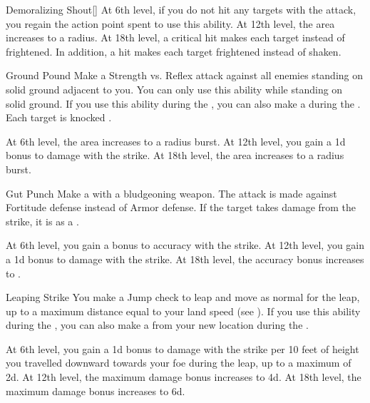 {\begin{ability}{Demoralizing Shout}[]
                At 6th level, if you do not hit any targets with the attack, you regain the action point spent to use this ability.
                At 12th level, the area increases to a \areahuge radius.
                At 18th level, a critical hit makes each target \panicked instead of frightened.
                In addition, a hit makes each target frightened instead of shaken.
            \end{ability}

            \begin{ability}{Ground Pound}
                Make a Strength vs. Reflex attack against all enemies standing on solid ground adjacent to you.
                You can only use this ability while standing on solid ground.
                If you use this ability during the , you can also make a  during the .
                \hit Each target is knocked \prone.

                At 6th level, the area increases to a \areamed radius burst.
                At 12th level, you gain a \plus1d bonus to damage with the strike.
                At 18th level, the area increases to a \arealarge radius burst.
            \end{ability}

            \begin{ability}{Gut Punch}
                Make a  with a bludgeoning weapon.
                The attack is made against Fortitude defense instead of Armor defense.
                If the target takes damage from the strike, it is \sickened as a .

                At 6th level, you gain a  bonus to accuracy with the strike.
                At 12th level, you gain a \plus1d bonus to damage with the strike.
                At 18th level, the accuracy bonus increases to .
            \end{ability}

            \begin{ability}{Leaping Strike}
                You make a Jump check to leap and move as normal for the leap, up to a maximum distance equal to your land speed (see ).
                If you use this ability during the , you can also make a  from your new location during the .

                At 6th level, you gain a \plus1d bonus to damage with the strike per 10 feet of height you travelled downward towards your foe during the leap, up to a maximum of \plus2d.
                At 12th level, the maximum damage bonus increases to \plus4d.
                At 18th level, the maximum damage bonus increases to \plus6d.
            \end{ability}

}
